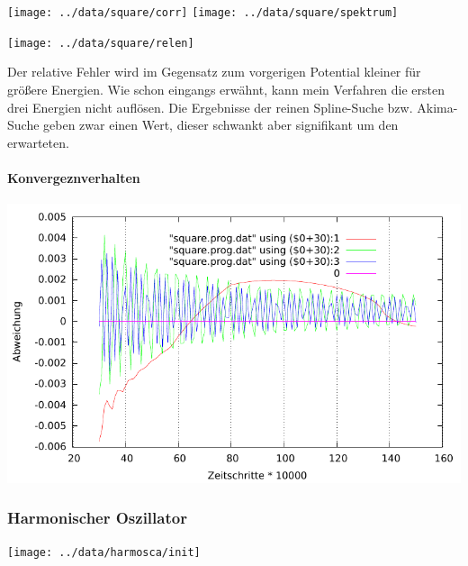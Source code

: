 \documentclass[10pt,a4paper,german]{scrartcl}
\begin{document}
		  	\texttt{[image: ../data/square/corr]}
    		\texttt{[image: ../data/square/spektrum]}
    		
			  \begin{center}\end{center}
			  
	  		\texttt{[image: ../data/square/relen]}
	  		
	  		Der relative Fehler wird im Gegensatz zum vorgerigen Potential
	  		kleiner für größere Energien. Wie schon eingangs erwähnt, kann
	  		mein Verfahren die ersten drei Energien nicht auflösen. Die 
	  		Ergebnisse der reinen Spline-Suche bzw. Akima-Suche geben zwar einen
	  		Wert, dieser schwankt aber signifikant um den erwarteten.
	  		
  			\paragraph*{Konvergeznverhalten}
  			  \includegraphics[scale=.62]{../static/square_konv.pdf}
	  		
      \subsubsection*{Harmonischer Oszillator}
  			\texttt{[image: ../data/harmosca/init]}
			  
		
			  \begin{center}\end{center}
			  
\end{document}

